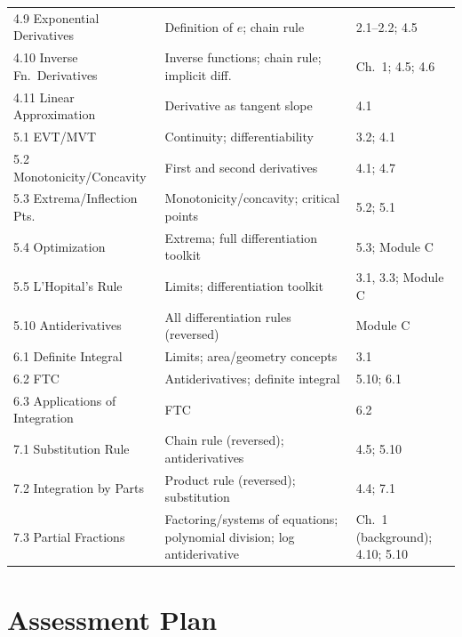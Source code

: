 \documentclass[11pt]{article}
\begin{document}
\begin{longtable}{p{3.4cm}p{5.3cm}p{4.8cm}}
4.9 Exponential Derivatives & Definition of $e$; chain rule & 2.1--2.2; 4.5 \\
4.10 Inverse Fn.\ Derivatives & Inverse functions; chain rule; implicit diff. & Ch.\ 1; 4.5; 4.6 \\
4.11 Linear Approximation & Derivative as tangent slope & 4.1 \\
5.1 EVT/MVT & Continuity; differentiability & 3.2; 4.1 \\
5.2 Monotonicity/Concavity & First and second derivatives & 4.1; 4.7 \\
5.3 Extrema/Inflection Pts. & Monotonicity/concavity; critical points & 5.2; 5.1 \\
5.4 Optimization & Extrema; full differentiation toolkit & 5.3; Module C \\
5.5 L'Hopital's Rule & Limits; differentiation toolkit & 3.1, 3.3; Module C \\
5.10 Antiderivatives & All differentiation rules (reversed) & Module C \\
6.1 Definite Integral & Limits; area/geometry concepts & 3.1 \\
6.2 FTC & Antiderivatives; definite integral & 5.10; 6.1 \\
6.3 Applications of Integration & FTC & 6.2 \\
7.1 Substitution Rule & Chain rule (reversed); antiderivatives & 4.5; 5.10 \\
7.2 Integration by Parts & Product rule (reversed); substitution & 4.4; 7.1 \\
7.3 Partial Fractions & Factoring/systems of equations; polynomial division; log antiderivative & Ch.\ 1 (background); 4.10; 5.10 \\
\end{longtable}

\section{Assessment Plan}
\end{document}
